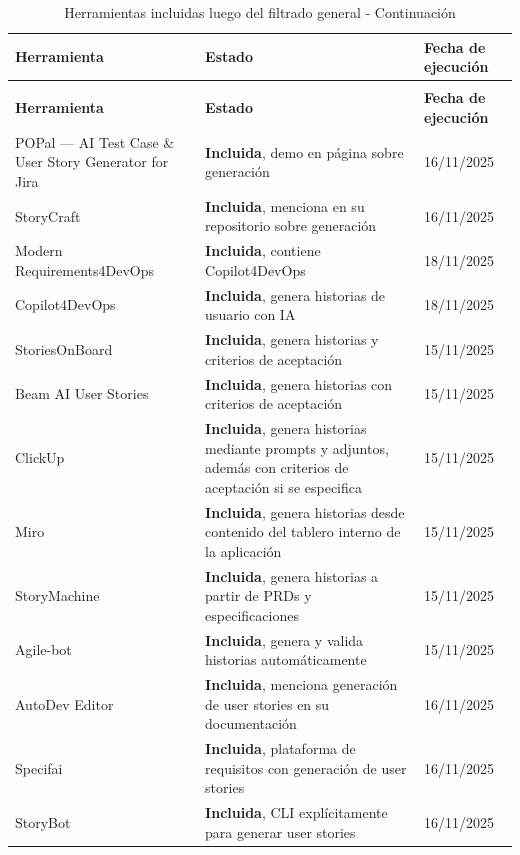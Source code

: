 \begin{center}
\begin{longtable}{|p{7cm}|p{4cm}|p{1.8cm}|}
\caption{Herramientas incluidas luego del filtrado general}
\label{table:filtrado2} \\
\hline
\textbf{Herramienta} & \textbf{Estado} & \textbf{Fecha de ejecución} \\
\hline
\endfirsthead

\caption{Herramientas incluidas luego del filtrado general - Continuación} \\
\hline
\textbf{Herramienta} & \textbf{Estado} & \textbf{Fecha de ejecución} \\
\hline
\endhead

\hline
\endfoot

\hline
\endlastfoot

POPal --- AI Test Case \& User Story Generator for Jira & \textbf{Incluida}, demo en página sobre generación & 16/11/2025 \\
StoryCraft & \textbf{Incluida}, menciona en su repositorio sobre generación & 16/11/2025 \\
Modern Requirements4DevOps & \textbf{Incluida}, contiene Copilot4DevOps & 18/11/2025 \\
Copilot4DevOps & \textbf{Incluida}, genera historias de usuario con IA & 18/11/2025 \\
StoriesOnBoard & \textbf{Incluida}, genera historias y criterios de aceptación & 15/11/2025 \\
Beam AI User Stories & \textbf{Incluida}, genera historias con criterios de aceptación & 15/11/2025 \\
ClickUp & \textbf{Incluida}, genera historias mediante prompts y adjuntos, además con criterios de aceptación si se especifica & 15/11/2025 \\
Miro & \textbf{Incluida}, genera historias desde contenido del tablero interno de la aplicación & 15/11/2025 \\
StoryMachine & \textbf{Incluida}, genera historias a partir de PRDs y especificaciones & 15/11/2025 \\
Agile-bot & \textbf{Incluida}, genera y valida historias automáticamente & 15/11/2025 \\
AutoDev Editor & \textbf{Incluida}, menciona generación de user stories en su documentación & 16/11/2025 \\
Specifai & \textbf{Incluida}, plataforma de requisitos con generación de user stories & 16/11/2025 \\
StoryBot & \textbf{Incluida}, CLI explícitamente para generar user stories & 16/11/2025 \\

\end{longtable}
\end{center}
